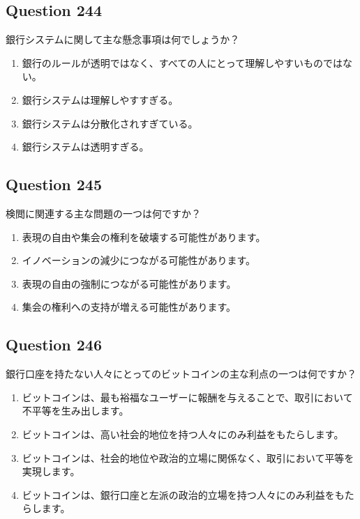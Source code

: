 \documentclass[12pt,a4paper]{article}
\begin{document}
\bigskip


\subsection*{Question 244}
銀行システムに関して主な懸念事項は何でしょうか？

\begin{enumerate}[label=\Alph*., leftmargin=*]
\item 銀行のルールが透明ではなく、すべての人にとって理解しやすいものではない。
\item 銀行システムは理解しやすすぎる。
\item 銀行システムは分散化されすぎている。
\item 銀行システムは透明すぎる。
\end{enumerate}

\bigskip


\subsection*{Question 245}
検閲に関連する主な問題の一つは何ですか？

\begin{enumerate}[label=\Alph*., leftmargin=*]
\item 表現の自由や集会の権利を破壊する可能性があります。
\item イノベーションの減少につながる可能性があります。
\item 表現の自由の強制につながる可能性があります。
\item 集会の権利への支持が増える可能性があります。
\end{enumerate}

\bigskip


\subsection*{Question 246}
銀行口座を持たない人々にとってのビットコインの主な利点の一つは何ですか？

\begin{enumerate}[label=\Alph*., leftmargin=*]
\item ビットコインは、最も裕福なユーザーに報酬を与えることで、取引において不平等を生み出します。
\item ビットコインは、高い社会的地位を持つ人々にのみ利益をもたらします。
\item ビットコインは、社会的地位や政治的立場に関係なく、取引において平等を実現します。
\item ビットコインは、銀行口座と左派の政治的立場を持つ人々にのみ利益をもたらします。
\end{enumerate}
\end{document}
